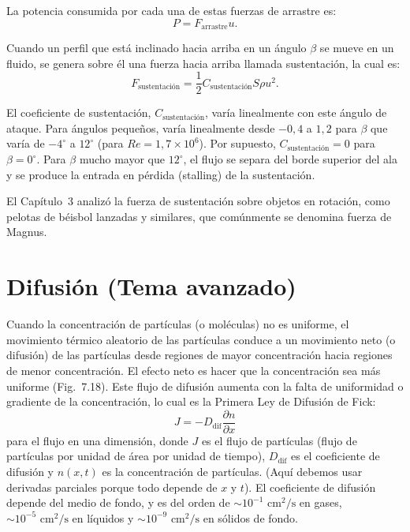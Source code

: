 \documentclass[12pt]{book}
\begin{document}
La potencia consumida por cada una de estas fuerzas de arrastre es:
\begin{equation}
P = F_{\text{arrastre}} u.
\label{eq:762}
\end{equation}

Cuando un perfil que está inclinado hacia arriba en un ángulo $\beta$ se mueve en un fluido, se genera sobre él una fuerza hacia arriba llamada sustentación, la cual es:
\begin{equation}
F_{\text{sustentación}} = \frac{1}{2} C_{\text{sustentación}} S \rho u^2.
\label{eq:763}
\end{equation}

El coeficiente de sustentación, $C_{\text{sustentación}}$, varía linealmente con este ángulo de ataque. Para ángulos pequeños, varía linealmente desde $-0{,}4$ a $1{,}2$ para $\beta$ que varía de $-4^\circ$ a $12^\circ$ (para $Re = 1{,}7 \times 10^6$). Por supuesto, $C_{\text{sustentación}} = 0$ para $\beta = 0^\circ$. Para $\beta$ mucho mayor que $12^\circ$, el flujo se separa del borde superior del ala y se produce la entrada en pérdida (stalling) de la sustentación.

El Capítulo~3 analizó la fuerza de sustentación sobre objetos en rotación, como pelotas de béisbol lanzadas y similares, que comúnmente se denomina fuerza de Magnus.

\section{Difusión (Tema avanzado)}

Cuando la concentración de partículas (o moléculas) no es uniforme, el movimiento térmico aleatorio de las partículas conduce a un movimiento neto (o difusión) de las partículas desde regiones de mayor concentración hacia regiones de menor concentración. El efecto neto es hacer que la concentración sea más uniforme (Fig.~7.18). Este flujo de difusión aumenta con la falta de uniformidad o gradiente de la concentración, lo cual es la Primera Ley de Difusión de Fick:
\begin{equation}
J = -D_{\text{dif}} \frac{\partial n}{\partial x}
\label{eq:764}
\end{equation}
para el flujo en una dimensión, donde $J$ es el flujo de partículas (flujo de partículas por unidad de área por unidad de tiempo), $D_{\text{dif}}$ es el coeficiente de difusión y $n(x,t)$ es la concentración de partículas. (Aquí debemos usar derivadas parciales porque todo depende de $x$ y $t$). El coeficiente de difusión depende del medio de fondo, y es del orden de ${\sim}10^{-1}\text{ cm}^2/\text{s}$ en gases, ${\sim}10^{-5}\text{ cm}^2/\text{s}$ en líquidos y ${\sim}10^{-9}\text{ cm}^2/\text{s}$ en sólidos de fondo.
\end{document}
